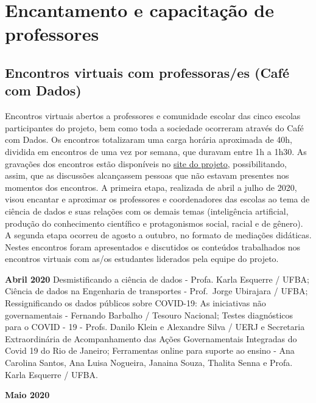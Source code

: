 \documentclass[
]{book}
\begin{document}
\hypertarget{encantamento-e-capacitauxe7uxe3o-de-professores}{%
\chapter{Encantamento e capacitação de professores}\label{encantamento-e-capacitauxe7uxe3o-de-professores}}

\hypertarget{encontros-virtuais-com-professorases-cafuxe9-com-dados}{%
\section{Encontros virtuais com professoras/es (Café com Dados)}\label{encontros-virtuais-com-professorases-cafuxe9-com-dados}}

Encontros virtuais abertos a professores e comunidade escolar das cinco escolas participantes do projeto, bem como toda a sociedade ocorreram através do Café com Dados. Os encontros totalizaram uma carga horária aproximada de 40h, dividida em encontros de uma vez por semana, que duravam entre 1h a 1h30. As gravações dos encontros estão disponíveis no \href{https://cienciadedadosep.wixsite.com/cafecomdados}{site do projeto}, possibilitando, assim, que as discussões alcançassem pessoas que não estavam presentes nos momentos dos encontros. A primeira etapa, realizada de abril a julho de 2020, visou encantar e aproximar os professores e coordenadores das escolas ao tema de ciência de dados e suas relações com os demais temas (inteligência artificial, produção do conhecimento científico e protagonismos social, racial e de gênero). A segunda etapa ocorreu de agosto a outubro, no formato de mediações didáticas. Nestes encontros foram apresentados e discutidos os conteúdos trabalhados nos encontros virtuais com as/os estudantes liderados pela equipe do projeto.

\textbf{Abril 2020}
Desmistificando a ciência de dados - Profa. Karla Esquerre / UFBA; Ciência de dados na Engenharia de transportes - Prof.~Jorge Ubirajara / UFBA; Ressignificando os dados públicos sobre COVID-19: As iniciativas não governamentais - Fernando Barbalho / Tesouro Nacional; Testes diagnósticos para o COVID - 19 - Profs. Danilo Klein e Alexandre Silva / UERJ e Secretaria Extraordinária de Acompanhamento das Ações Governamentais Integradas do Covid 19 do Rio de Janeiro; Ferramentas online para suporte ao ensino - Ana Carolina Santos, Ana Luisa Nogueira, Janaina Souza, Thalita Senna e Profa. Karla Esquerre / UFBA.

\textbf{Maio 2020}
\end{document}
